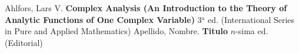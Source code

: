 \begin{thebibliography}{99}
     Ahlfors, Lars V. \textbf{Complex Analysis (An Introduction to the Theory of Analytic Functions of One Complex Variable)} 3$^{\mathrm{a}}$
	ed. (International Series in Pure and Applied Mathematics) 
     Apellido, Nombre. \textbf{Titulo} $n$-sima ed. (Editorial) 

\end{thebibliography}
